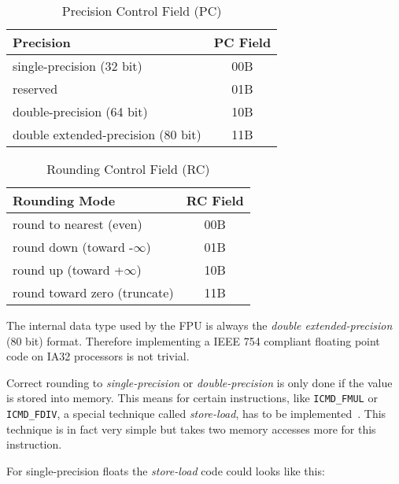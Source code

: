 \begin{table*}
\begin{center}
\begin{tabular}[b]{|l|c|}
\hline 
Precision                          & PC Field \\ \hline
single-precision (32 bit)          & 00B      \\ \hline
reserved                           & 01B      \\ \hline
double-precision (64 bit)          & 10B      \\ \hline
double extended-precision (80 bit) & 11B      \\ \hline
\end{tabular}
\caption{Precision Control Field (PC)}
\label{PCField}
\end{center}
\end{table*}

\begin{table*}
\begin{center}
\begin{tabular}[b]{|l|c|}
\hline 
Rounding Mode                 & RC Field \\ \hline
round to nearest (even)       & 00B      \\ \hline
round down (toward -$\infty$) & 01B      \\ \hline
round up (toward +$\infty$)   & 10B      \\ \hline
round toward zero (truncate)  & 11B      \\ \hline
\end{tabular}
\caption{Rounding Control Field (RC)}
\label{RCField}
\end{center}
\end{table*}

The internal data type used by the FPU is always the \textit{double
extended-precision} (80 bit) format. Therefore implementing a IEEE 754
compliant floating point code on IA32 processors is not trivial.

Correct rounding to \textit{single-precision} or
\textit{double-precision} is only done if the value is stored into
memory. This means for certain instructions, like \texttt{ICMD\_FMUL}
or \texttt{ICMD\_FDIV}, a special technique called
\textit{store-load}, has to be implemented~\cite{OgKoNa02}. This
technique is in fact very simple but takes two memory accesses more
for this instruction.

For single-precision floats the \textit{store-load} code could looks
like this:

